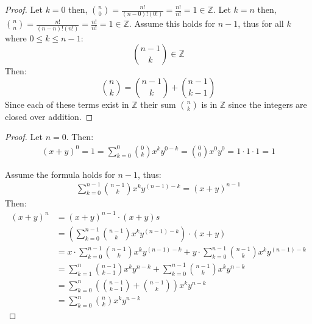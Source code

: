 \documentclass[8pt]{article}
\begin{document}
\begin{proof}
    Let $k = 0$ then, $\binom{n}{0} = \frac{n!}{(n - 0)!(0!)} = \frac{n!}{n!} = 1 \in \mathbb{Z}$.
    Let $k = n$ then, $\binom{n}{n} = \frac{n!}{(n - n)!(n!)} = \frac{n!}{n!} = 1 \in \mathbb{Z}$.
    Assume this holds for $n - 1$, thus for all $k$ where $0 \le k \le n - 1$:
    \[\binom{n - 1}{k} \in \mathbb{Z}\]
    Then:
    \[\binom{n}{k} =  \binom{n - 1}{k} + \binom{n - 1}{k - 1}\]
    Since each of these terms exist in $\mathbb{Z}$ their sum $\binom{n}{k}$ is in
    $\mathbb{Z}$ since the integers are closed over addition.
\end{proof}

\begin{proof}
    Let $n = 0$. Then:
    \begin{align*}
        {(x + y)}^0 = 1 = \sum_{k = 0}^{0} \binom{0}{k} x^k y^{0-k} = \binom{0}{0} x^0 y^0 = 1 \cdot 1 \cdot 1 = 1
    \end{align*}

    Assume the formula holds for $n - 1$, thus:
    \begin{align*}
        \sum_{k = 0}^{n - 1} \binom{n - 1}{k} x^k y^{(n-1)-k} = (x+y)^{n - 1}
    \end{align*}
    Then:
    \begin{align*}
        {(x+y)}^n & = {(x+y)}^{n - 1} \cdot (x + y)  s                                                                                              \\
                  & = \left(\sum_{k = 0}^{n - 1} \binom{n - 1}{k} x^k y^{(n-1)-k}\right) \cdot (x + y)                                              \\
                  & = x \cdot \sum_{k = 0}^{n - 1} \binom{n - 1}{k} x^k y^{(n-1)-k} + y \cdot \sum_{k = 0}^{n - 1} \binom{n - 1}{k} x^k y^{(n-1)-k} \\
                  & = \sum_{k = 1}^{n} \binom{n - 1}{k - 1} x^k y^{n - k} + \sum_{k = 0}^{n - 1} \binom{n - 1}{k} x^k y^{n - k}                     \\
                  & = \sum_{k = 0}^{n} \left( \binom{n - 1}{k - 1} + \binom{n - 1}{k} \right) x^k y^{n - k}                                         \\
                  & = \sum_{k = 0}^{n} \binom{n}{k} x^k y^{n - k}
    \end{align*}
\end{proof}
\end{document}
